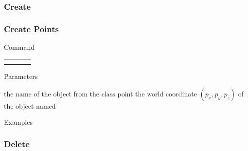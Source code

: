 \documentclass[9pt]{beamer}
\begin{document}
\subsubsection{Create}

\begin{frame}[t] \frametitle{Create Points}

	\begin{block}{Command} 
		\begin{tabularx}{\textwidth}{@{}l@{}l@{}l@{}R}
			 &
			  	 &
			  	 & \InstrItem \\
			 &
				 &
				 & \InstrItem
		\end{tabularx}
	\end{block}

	\begin{block}{Parameters} \begin{itemize}
		   the name of the object from the class point
		     the world coordinate $(p_x, p_y, p_z)$ of the object named 
	\end{itemize} \end{block}

	\begin{block}{Examples}
	\end{block}

\end{frame}

\subsubsection{Delete}
\end{document}

